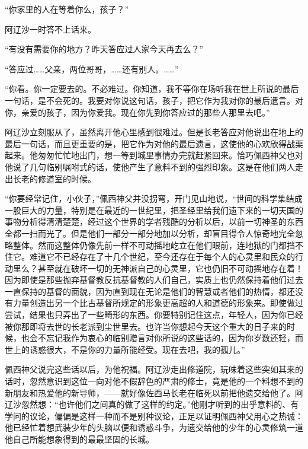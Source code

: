 \par “你家里的人在等着你么，孩子？”
\par 阿辽沙一时答不上话来。
\par “有没有需要你的地方？昨天答应过人家今天再去么？”
\par “答应过……父亲，两位哥哥，……还有别人。……”
\par “你看。你一定要去的。不必难过。你知道，我不等你在场听我在世上所说的最后一句话，是不会死的。我要对你说这句话，孩子，把它作为我对你的最后遗言。对你，亲爱的孩子，因为你爱我。现在你先到你答应过的那些人那里去吧。”
\par 阿辽沙立刻服从了，虽然离开他心里感到很难过。但是长老答应对他说出在地上的最后一句话，而且更重要的是，把它作为对他的最后遗言，这使他的心欢欣得战栗起来。他匆匆忙忙地出门，想一等到城里事情办完就赶紧回来。恰巧佩西神父也对他说了几句临别嘱咐式的话，使他产生了意料不到的强烈印象。这是在他们两人走出长老的修道室的时候。
\par “你要经常记住，小伙子，”佩西神父并没拐弯，开门见山地说，“世间的科学集结成一股巨大的力量，特别是在最近的一世纪里，把圣经里给我们遗下来的一切天国的事物分析得清清楚楚，经过这个世界的学者残酷的分析以后，以前一切神圣的东西全都一扫而光了。但是他们一部分一部分地加以分析，却盲目得令人惊奇地完全忽略整体。然而这整体仍像先前一样不可动摇地屹立在他们眼前，连地狱的门都挡不住它。难道它不已经存在了十几个世纪，至今还存在于每个人的心灵里和民众的行动里么？甚至就在破坏一切的无神派自己的心灵里，它也仍旧不可动摇地存在着！因为即使是那些抛弃基督教反抗基督教的人们自己，实质上也仍然保持着他们过去一直保持的基督的面貌，因为直到现在无论是他们的智慧或者他们的热情，都还没有力量创造出另一个比古基督所规定的形象更高超的人和道德的形象来。即使做过尝试，结果也只弄出了一些畸形的东西。你要特别记住这点，年轻人，因为你已经被你那即将去世的长老派到尘世里去。也许当你想起今天这个重大的日子来的时候，也会不忘记我作为衷心的临别赠言对你所说的这些话的，因为你岁数还轻，而世上的诱惑很大，不是你的力量所能经受。现在去吧，我的孤儿。”
\par 佩西神父说完这些话以后，为他祝福。阿辽沙走出修道院，玩味着这些突如其来的话时，忽然意识到这位一向对他不假辞色的严肃的修士，竟是他的一个料想不到的新朋友和热爱他的新导师，——就好像佐西马长老在临死以前把他遗交给他了。阿辽沙忽然想：“也许他们之间真的做了这样的约定。”他刚才听到的出乎意料的、有学问的议论，偏偏是这样一种而不是别种议论，正足以证明佩西神父用心之热诚：他已经忙着想武装少年的头脑以便和诱惑斗争，为遗交给他的少年的心灵修筑一道他自己所能想象得到的最最坚固的长城。
